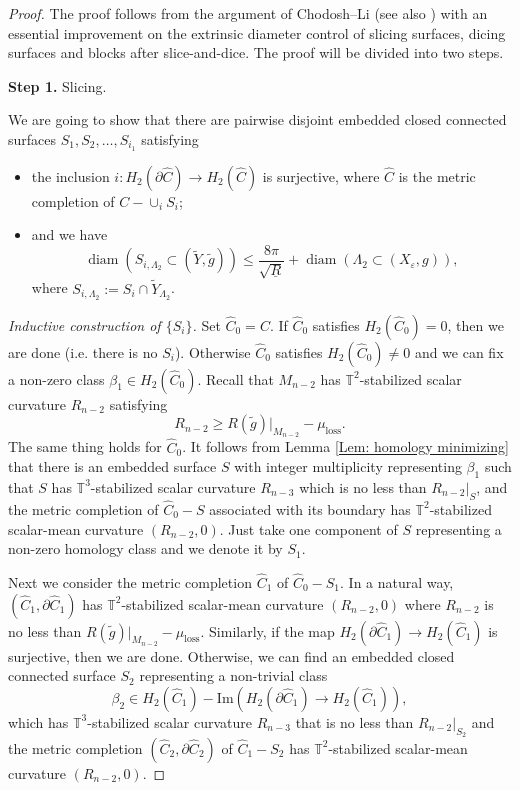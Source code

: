 \documentclass[11pt,letterpaper]{amsart}
\numberwithin{equation}{section}
\theoremstyle{definition}
\DeclareMathOperator{\diam}{diam}
\newcommand{\ve}{\varepsilon}
\begin{document}
\begin{proof}
The proof follows from the argument of Chodosh--Li \cite[Section 6]{CL20} (see also \cite[Section 2]{Zhu23}) with an essential improvement on the extrinsic diameter control of slicing surfaces, dicing surfaces and blocks after slice-and-dice. The proof will be divided into two steps.


\medskip
\noindent
{\bf Step 1.} Slicing.
\medskip

We are going to show that there are pairwise disjoint embedded closed {connected} surfaces $S_1,S_2,\ldots,S_{i_1}$ satisfying
\begin{itemize}\setlength{\itemsep}{1mm}
\item the inclusion $i:H_2(\partial\hat C)\to H_2(\hat{C})$ is surjective, where $\hat C$ is the metric completion of $C-\cup_i S_i$;
\item and we have
$$
\diam(S_{i,\Lambda_2}\subset (\tilde Y,\tilde g))\leq \frac{8\pi}{\sqrt{\underline R}}+\diam(\Lambda_2\subset(X_\ve,g)),
$$
where $S_{i,\Lambda_2}:=S_i\cap \tilde Y_{\Lambda_2}$.
\end{itemize}

{\it Inductive construction of $\{S_i\}$.} Set $\hat{C}_{0}= C$. If $\hat C_0$ satisfies $H_2(\hat C_0)=0$, then we are done (i.e. there is no $S_{i}$).
Otherwise $\hat C_0$ satisfies $H_2(\hat C_0)\neq 0$ and we can fix a non-zero class $\beta_1\in H_2(\hat C_0)$. Recall that $M_{n-2}$ has $\mathbb T^2$-stabilized scalar curvature $R_{n-2}$ satisfying
\begin{equation}\label{Eq: SD1}
R_{n-2}\geq R(\tilde g)|_{M_{n-2}}-\mu_{\mathrm{loss}}.
\end{equation}
The same thing holds for $\hat C_0$. It follows from Lemma \ref{Lem: homology minimizing} that there is an embedded surface $S$ with integer multiplicity representing $\beta_{1}$ such that $S$ has $\mathbb T^3$-stabilized scalar curvature $R_{n-3}$ which is no less than $R_{n-2}|_S$, and the metric completion of $\hat{C}_{0}-S$ associated with its boundary has $\mathbb{T}^{2}$-stabilized scalar-mean curvature $(R_{n-2},0)$.
Just take one component of $S$ {representing a non-zero homology class} and we denote it by $S_1$.

Next we consider the metric completion $\hat C_1$ of $\hat C_0-S_1$. In a natural way, $(\hat C_1,\partial\hat C_1)$ has $\mathbb T^2$-stabilized scalar-mean curvature $(R_{n-2},0)$ where $R_{n-2}$ is no less than $R(\tilde g)|_{M_{n-2}}-\mu_{\mathrm{loss}}$. Similarly, if the map $H_2(\partial \hat C_1)\to H_2(\hat C_1)$ is surjective, then we are done. Otherwise, we can find an embedded {closed connected} surface $S_2$ representing a non-trivial class
$$
\beta_2\in H_2(\hat C_1)-\mathrm{Im}\left(H_2(\partial \hat C_1)\to H_2(\hat C_1)\right),
$$
which has $\mathbb T^3$-stabilized scalar curvature $R_{n-3}$ that is no less than $R_{n-2}|_{S_2}$  and the metric completion $(\hat C_2,\partial\hat C_2)$ of $\hat{C}_{1}-S_{2}$ has $\mathbb{T}^{2}$-stabilized scalar-mean curvature $(R_{n-2},0)$.


\end{proof}
\end{document}
